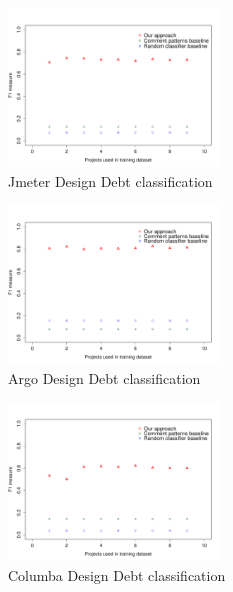 \begin{figure}[thb!]
  \centering
  \includegraphics[width=0.50\textwidth]{figures/appendix/iteration_details/design_jmeter.pdf}
  \vspace{-3mm}
  \caption{Jmeter Design Debt classification}
  \label{fig:design_jmeter}
\end{figure}

\begin{figure}[thb!]
  \centering
  \includegraphics[width=0.50\textwidth]{figures/appendix/iteration_details/design_argo.pdf}
  \vspace{-3mm}
  \caption{Argo Design Debt classification}
  \label{fig:design_argo}
\end{figure}

\begin{figure}[thb!]
  \centering
  \includegraphics[width=0.50\textwidth]{figures/appendix/iteration_details/design_columba.pdf}
  \vspace{-3mm}
  \caption{Columba Design Debt classification}
  \label{fig:design_columba}
\end{figure}

